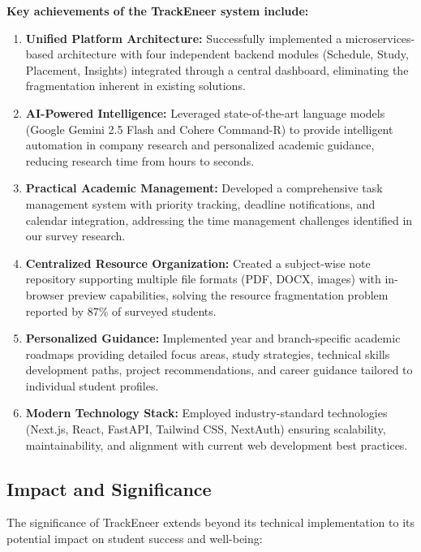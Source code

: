 \documentclass[12pt]{article}
\begin{document}
\textbf{Key achievements of the TrackEneer system include:}

\begin{enumerate}
    \item \textbf{Unified Platform Architecture:} Successfully implemented a microservices-based architecture with four independent backend modules (Schedule, Study, Placement, Insights) integrated through a central dashboard, eliminating the fragmentation inherent in existing solutions.
    
    \item \textbf{AI-Powered Intelligence:} Leveraged state-of-the-art language models (Google Gemini 2.5 Flash and Cohere Command-R) to provide intelligent automation in company research and personalized academic guidance, reducing research time from hours to seconds.
    
    \item \textbf{Practical Academic Management:} Developed a comprehensive task management system with priority tracking, deadline notifications, and calendar integration, addressing the time management challenges identified in our survey research.
    
    \item \textbf{Centralized Resource Organization:} Created a subject-wise note repository supporting multiple file formats (PDF, DOCX, images) with in-browser preview capabilities, solving the resource fragmentation problem reported by 87\% of surveyed students.
    
    \item \textbf{Personalized Guidance:} Implemented year and branch-specific academic roadmaps providing detailed focus areas, study strategies, technical skills development paths, project recommendations, and career guidance tailored to individual student profiles.
    
    \item \textbf{Modern Technology Stack:} Employed industry-standard technologies (Next.js, React, FastAPI, Tailwind CSS, NextAuth) ensuring scalability, maintainability, and alignment with current web development best practices.
\end{enumerate}

\subsection{Impact and Significance}
The significance of TrackEneer extends beyond its technical implementation to its potential impact on student success and well-being:
\end{document}
